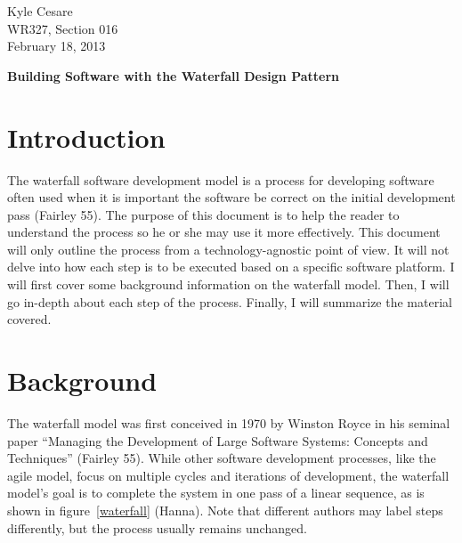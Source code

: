 \documentclass[12pt,letterpaper]{article}
\begin{document}
\begin{flushleft}
  Kyle Cesare \\
  WR327, Section 016\\
  February 18, 2013
\end{flushleft}

\thispagestyle{empty}

\begin{center}
  \Large \textbf{Building Software with the Waterfall Design Pattern}
\end{center}

\section*{Introduction}
The waterfall software development model is a process for developing software
often used when it is important the software be correct on the initial
development pass (Fairley 55).  The purpose of this document is to help the
reader to understand the process so he or she may use it more effectively.  This
document will only outline the process from a technology-agnostic point of view.
It will not delve into how each step is to be executed based on a specific
software platform.  I will first cover some background information on the
waterfall model.  Then, I will go in-depth about each step of the process.
Finally, I will summarize the material covered.

\section*{Background}
The waterfall model was first conceived in 1970 by Winston Royce in his seminal
paper ``Managing the Development of Large Software Systems: Concepts and
Techniques'' (Fairley 55).  While other software development processes, like the
agile model, focus on multiple cycles and iterations of development, the
waterfall model's goal is to complete the system in one pass of a linear
sequence, as is shown in figure~\ref{waterfall} (Hanna).  Note that different
authors may label steps differently, but the process usually remains unchanged.
\end{document}
